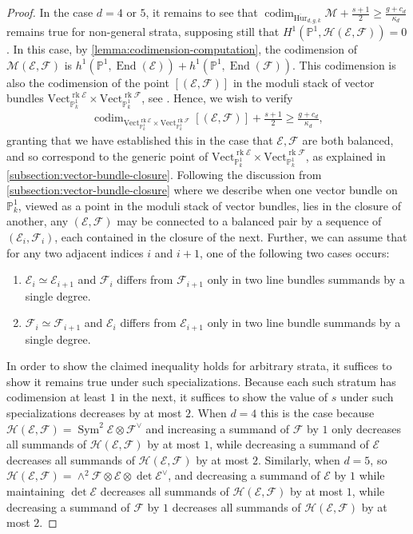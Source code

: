 \documentclass[12 pt]{amsart}
\theoremstyle{plain}
\theoremstyle{definition}
\theoremstyle{remark}
\numberwithin{equation}{section}
\newcommand\bp{\mathbb P}
\newcommand\sce{\mathscr E}
\newcommand\scf{\mathscr F}
\newcommand\sch{\mathscr H}
\newcommand\vect[2]{\mathrm{Vect}^{#1}_{#2}} %
\newcommand\bighurg[3]{\overline{\mathrm{Hur}}_{#1,#2, #3}} %
\newcommand\ce{\mathscr M} %
\DeclareMathOperator\rk{rk}
\DeclareMathOperator\codim{codim}
\DeclareMathOperator\End{End}
\DeclareMathOperator\sym{Sym}
\begin{document}
\begin{proof}
	In the case $d = 4$ or $5$, it remains to see that 
$\codim_{\bighurg d g k} \ce + \frac{s + 1}{2} \geq \frac{g+c_d}{\kappa_d}$
remains true for non-general strata,
	supposing still that $H^1(\bp^1, \sch(\sce, \scf)) = 0$.  In
	this case, by \autoref{lemma:codimension-computation}, the codimension
	of $\ce(\sce, \scf)$ is $h^1(\bp^1, \End(\sce)) + h^1(\bp^1, \End(\scf))$.  
	This codimension is also the codimension of the point $[(\sce,\scf)]$ 
	in the moduli stack of vector bundles
	$\vect {\rk \sce} {\bp^1_k} \times \vect {\rk \scf} {\bp^1_k}$,
	see \cite[(3.1)]{larson:the-intersection-theory-of-the-moduli-stack}.
	Hence, we wish to verify
	\begin{align*}
	\codim_{\vect {\rk \sce} {\bp^1_k} \times \vect {\rk \scf} {\bp^1_k}}
	[(\sce, \scf)] + \frac{s + 1}{2} \geq \frac{g+c_d}{\kappa_d},
	\end{align*}
	granting that we have established this in the case that $\sce, \scf$ are
	both balanced, and so correspond to the generic point of
	$\vect {\rk \sce} {\bp^1_k} \times \vect {\rk \scf} {\bp^1_k}$,
	as explained in \autoref{subsection:vector-bundle-closure}.
	Following the discussion from
\autoref{subsection:vector-bundle-closure} where we describe when one vector
bundle on $\bp^1_k$, viewed as a point in the moduli stack of vector bundles,
lies in the closure of another, any
$(\sce, \scf)$ may be connected to a balanced pair by a sequence
	of $(\sce_i, \scf_i)$, each contained in the closure of the next.  Further, we can
	assume that for any two adjacent indices $i$ and $i+1$, one of the
	following two cases occurs:
	\begin{enumerate}
		\item $\sce_i \simeq \sce_{i+1}$ and $\scf_i$ differs from
			$\scf_{i+1}$ only in two line bundles summands by a single degree.
		\item $\scf_i \simeq \scf_{i+1}$ and $\sce_i$ differs from $\sce_{i+1}$
			only in two line bundle summands by a single degree.
	\end{enumerate}
	In order to show the claimed inequality
	holds for arbitrary strata, it suffices to show it remains true under
	such specializations.  Because each such stratum has codimension at least
	$1$ in the next, it suffices to show the value of $s$ under such
	specializations decreases by at most $2$.  When $d = 4$ this is the case
	because $\sch(\sce, \scf) = \sym^2 \sce \otimes \scf^\vee$ and
	increasing a summand of $\scf$ by $1$ only decreases all summands of
	$\sch(\sce, \scf)$ by at most $1$, while decreasing a summand of $\sce$
	decreases all summands of $\sch(\sce, \scf)$ by at most $2$.  Similarly,
	when $d = 5$, so $\sch(\sce, \scf) = \wedge^2 \scf \otimes \sce \otimes
	\det \sce^\vee$, and decreasing a summand of $\sce$ by $1$ while
	maintaining $\det \sce$ decreases all summands of $\sch(\sce, \scf)$ by
	at most $1$, while decreasing a summand of $\scf$ by $1$ decreases all
summands of $\sch(\sce, \scf)$ by at most $2$.  \end{proof}
\end{document}
